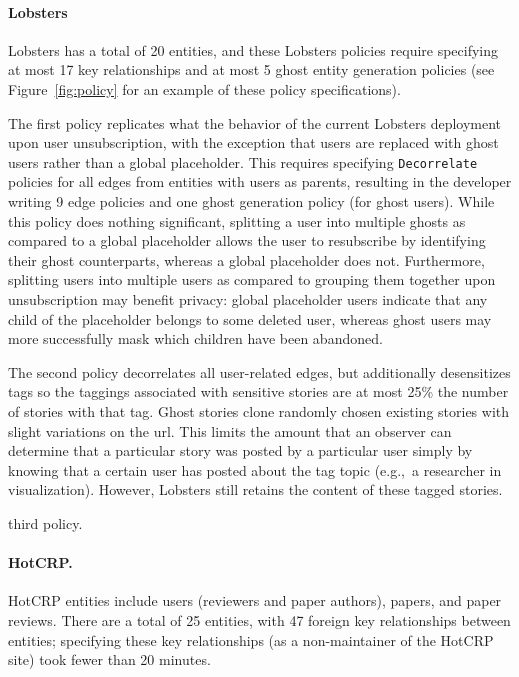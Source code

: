 \paragraph{Lobsters}
Lobsters has a total of 20 entities, and 
these Lobsters policies require specifying at most 17 key
relationships and at most 5 ghost entity generation policies (see Figure~\ref{fig:policy} for an example
of these policy specifications).

The first policy replicates what the behavior of the current Lobsters deployment upon user
unsubscription, with the exception that users are replaced with ghost users rather than a global
placeholder. This requires specifying \texttt{Decorrelate} policies for all edges from entities with users
as parents, resulting in the developer writing 9 edge policies and one ghost generation policy (for
ghost users). While this policy does nothing significant, splitting a user into multiple ghosts as
compared to a global placeholder allows the user to resubscribe by identifying their ghost
counterparts, whereas a global placeholder does not. Furthermore, splitting users into multiple
users as compared to grouping them together upon unsubscription may benefit privacy: global
placeholder users indicate that any child of the placeholder belongs to some deleted user, whereas
ghost users may more successfully mask which children have been abandoned.

The second policy decorrelates all user-related edges, but additionally desensitizes tags so the
taggings associated with sensitive stories are at most 25\% the number of stories with that tag.
Ghost stories clone randomly chosen existing stories with slight variations on the url.
This limits the amount that an observer can determine that a particular story was posted by a
particular user simply by knowing that a certain user has posted about the tag topic (e.g.,\ a researcher 
in visualization). However, Lobsters still retains the content of these tagged stories.

 third policy.

\paragraph{HotCRP.}
HotCRP entities include users (reviewers and paper authors), papers, and paper reviews. There are a total of 25
entities, with 47 foreign key relationships between entities; specifying these key relationships (as
a non-maintainer of the HotCRP site) took fewer than 20 minutes.

